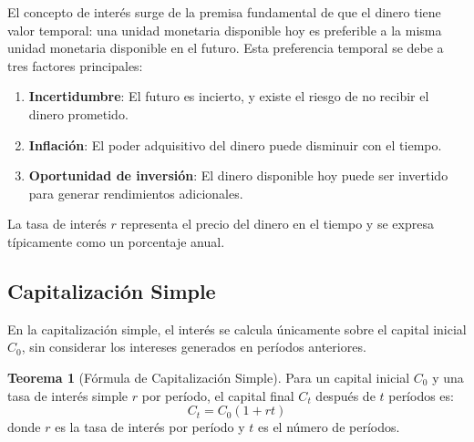 \documentclass[12pt,a4paper]{article}
\theoremstyle{definition}
\newtheorem{teorema}{Teorema}[section]
\begin{document}
El concepto de interés surge de la premisa fundamental de que el dinero tiene valor temporal: una unidad monetaria disponible hoy es preferible a la misma unidad monetaria disponible en el futuro. Esta preferencia temporal se debe a tres factores principales:

\begin{enumerate}
\item \textbf{Incertidumbre}: El futuro es incierto, y existe el riesgo de no recibir el dinero prometido.
\item \textbf{Inflación}: El poder adquisitivo del dinero puede disminuir con el tiempo.
\item \textbf{Oportunidad de inversión}: El dinero disponible hoy puede ser invertido para generar rendimientos adicionales.
\end{enumerate}

La tasa de interés $r$ representa el precio del dinero en el tiempo y se expresa típicamente como un porcentaje anual.

\begin{center}
    
\end{center}

\subsection{Capitalización Simple}

En la capitalización simple, el interés se calcula únicamente sobre el capital inicial $C_0$, sin considerar los intereses generados en períodos anteriores.

\begin{teorema}[Fórmula de Capitalización Simple]
Para un capital inicial $C_0$ y una tasa de interés simple $r$ por período, el capital final $C_t$ después de $t$ períodos es:
\begin{equation}
C_t = C_0(1 + rt)
\end{equation}
donde $r$ es la tasa de interés por período y $t$ es el número de períodos.
\end{teorema}

\begin{center}
    
\end{center}
\end{document}

